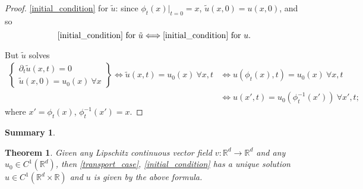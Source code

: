 \documentclass[12pt]{article}
\newtheorem{theorem}{Theorem}[section]
\theoremstyle{definition}
\newtheorem*{summary}{Summary}
\begin{document}
\begin{enumerate}[label=\alph*)]
\begin{proof}
\eqref{initial_condition} for $\tilde u$: since $\phi_t(x)|_{t=0}=x$, $\tilde u(x,0)=u(x,0)$, and so
\[\text{\eqref{initial_condition} for }\tilde u\Longleftrightarrow\text{\eqref{initial_condition} for }u.\]

But $\tilde u$ solves
\begin{align*}
\left\{\begin{array}{l}\partial_t\tilde u(x,t)=0\\\tilde u(x,0)=u_0(x)\ \forall x\end{array}\right\}\Longleftrightarrow\tilde u(x,t)=u_0(x)\ \forall x,t&\Longleftrightarrow u(\phi_t(x),t)=u_0(x)\ \forall x,t\\
&\Longleftrightarrow u(x',t)=u_0(\phi_t^{-1}(x'))\ \forall x',t;
\end{align*}
where $x'=\phi_t(x)$, $\phi_t^{-1}(x')=x$.
\end{proof}
\end{enumerate}

\begin{summary}
\begin{theorem}
Given any Lipschitz continuous vector field $v:\mathbb R^d\rightarrow\mathbb R^d$ and any $u_0\in C^1(\mathbb R^d)$, then \eqref{transport_case}, \eqref{initial_condition} has a unique solution $u\in C^1(\mathbb R^d\times\mathbb R)$ and $u$ is given by the above formula.
\end{theorem}
\end{summary}
\end{document}
